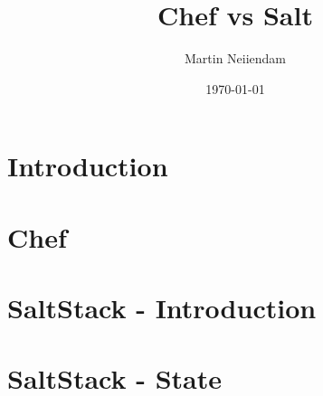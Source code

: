 \documentclass{beamer}
\title{Chef vs Salt}
\author{Martin Neiiendam}
\date{\today}
\begin{document}
\frame{\titlepage}

\section[Outline]{}
\frame{\tableofcontents}

\section{Introduction}


\section{Chef}


\section{SaltStack - Introduction}


\section{SaltStack - State}

\end{document}
